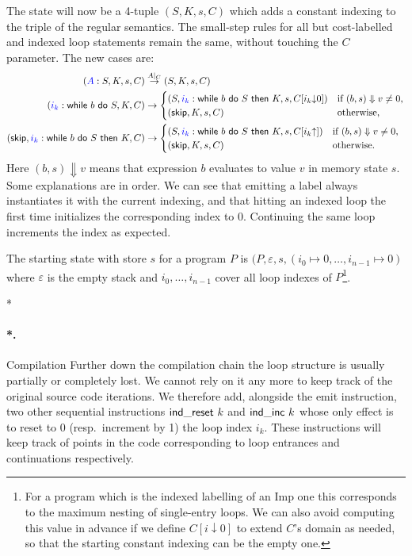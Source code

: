 \documentclass[submission,copyright,creativecommons]{eptcs}
\makeatletter
\theoremstyle{definition}
\newcommand{\s}[1]{{\sf #1}}    \newcommand{\vc}[1]{{\bf #1}}
\newcommand{\eval}{\Downarrow}
\newcommand{\imp}{{\sf Imp}}            \newcommand{\vm}{{\sf Vm}}              \newcommand{\mips}{{\sf Mips}}          \newcommand{\Clight}{{\sf Clight}}        \newcommand{\Cminor}{{\sf Cminor}}
\newcommand{\sop}[1]{\s{#1}\ }
\newcommand{\sbin}[1]{\ \s{#1}\ }
\newcommand{\alphab}{A}
\renewcommand{\to}[1][]{\stackrel{#1}{\rightarrow}}
\def\lbl#1:{\mbox{\color{blue}$#1$}:}
\let\oldparagraph\paragraph
\def\paragraph{\@ifnextchar*\new@paragraph@star\new@paragraph}
\def\new@paragraph@star*#1{\oldparagraph*{#1.}}
\def\new@paragraph#1{\oldparagraph{#1.}}
\makeatother
\begin{document}
The state will now be a 4-tuple $(S,K,s,C)$ which adds a constant indexing to the triple of the regular semantics.
The small-step rules for all but cost-labelled and indexed loop statements remain the same,
without touching the $C$ parameter.
The new cases are:
$$\begin{aligned}
   (\lbl\alphab : S,K,s,C) &\to[\alphab|_C] (S,K,s,C)\\
   (\lbl{i_k}:\sop{while}b\sbin{do}S,K,C) &\to
    \begin{cases}
     (S,\lbl{i_k}:\sop{while}b\sbin{do}S\sbin{then} K,s,C[i_k{\downarrow}0])
     &\text{if $(b,s)\eval v\neq 0$,}\\
     (\s{skip}, K, s, C) &\text{otherwise,}
    \end{cases}\\
   (\s{skip}, \lbl{i_k}:\sop{while}b\sbin{do}S\sbin{then}K,C) &\to
    \begin{cases}
     (S,\lbl{i_k}:\sop{while}b\sbin{do}S\sbin{then} K,s,C[i_k{\uparrow}])
      & \text{if $(b,s)\eval v\neq 0$,}\\
     (\s{skip}, K, s, C) & \text{otherwise.}
    \end{cases}
  \end{aligned}$$
Here $(b,s)\Downarrow v$ means that expression $b$ evaluates to value $v$ in
memory state $s$. Some explanations are in order. We can see that
emitting a label always instantiates it with the current indexing, and that
hitting an indexed loop the first time initializes the corresponding index to 0. Continuing the same loop increments the index as expected.

The starting state with store $s$ for a program $P$ is $(P,\varepsilon,s,(i_0\mapsto 0,\dots,i_{n-1}\mapsto 0)$ where
$\varepsilon$ is the empty stack and $i_0,\ldots,i_{n-1}$ cover all loop indexes of $P$\footnote{For a program which is the indexed labelling of an \imp{} one this corresponds to the maximum nesting of single-entry loops.
We can also avoid computing this value in advance if we define $C[i{\downarrow}0]$ to extend $C$'s domain as needed, so that the starting constant indexing can be the empty one.}.

\paragraph*{Compilation}
Further down the compilation chain the loop structure is usually partially or completely lost.
We cannot rely on it any more to keep track of the original source code iterations.
We therefore add, alongside the \s{emit} instruction, two other sequential instructions $\sop{ind\_reset}k$ and $\sop{ind\_inc}k$ whose only effect is to reset to 0 (resp.\ increment by 1) the loop index $i_k$. These instructions
will keep track of points in the code corresponding to loop entrances and continuations respectively.
\end{document}
